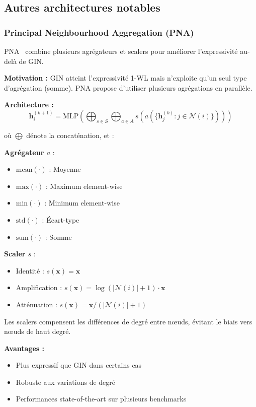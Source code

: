 \subsection{Autres architectures notables}

\subsubsection{Principal Neighbourhood Aggregation (PNA)}

PNA~\cite{Corso2020} combine plusieurs agrégateurs et scalers pour améliorer l'expressivité au-delà de GIN.

\textbf{Motivation :}
GIN atteint l'expressivité 1-WL mais n'exploite qu'un seul type d'agrégation (somme). PNA propose d'utiliser plusieurs agrégations en parallèle.

\textbf{Architecture :}
\[
\mathbf{h}_i^{(k+1)} = \text{MLP}\left(\bigoplus_{s \in S} \bigoplus_{a \in A} s\left(a\left(\{\mathbf{h}_j^{(k)} : j \in \mathcal{N}(i)\}\right)\right)\right)
\]

où $\bigoplus$ dénote la concaténation, et :

\textbf{Agrégateur $a$} :
\begin{itemize}
    \item $\text{mean}(\cdot)$ : Moyenne
    \item $\text{max}(\cdot)$ : Maximum element-wise
    \item $\text{min}(\cdot)$ : Minimum element-wise
    \item $\text{std}(\cdot)$ : Écart-type
    \item $\text{sum}(\cdot)$ : Somme
\end{itemize}

\textbf{Scaler $s$} :
\begin{itemize}
    \item Identité : $s(\mathbf{x}) = \mathbf{x}$
    \item Amplification : $s(\mathbf{x}) = \log(|\mathcal{N}(i)| + 1) \cdot \mathbf{x}$
    \item Atténuation : $s(\mathbf{x}) = \mathbf{x} / (|\mathcal{N}(i)| + 1)$
\end{itemize}

Les scalers compensent les différences de degré entre nœuds, évitant le biais vers nœuds de haut degré.

\textbf{Avantages :}
\begin{itemize}
    \item Plus expressif que GIN dans certains cas
    \item Robuste aux variations de degré
    \item Performances state-of-the-art sur plusieurs benchmarks
\end{itemize}

